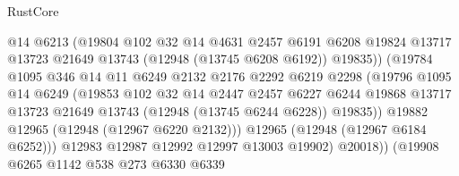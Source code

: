 \begin{lexlean}{RustCore}
\begin{coremodule}
                                @14
                                @6213
                                (@19804
                                  @102
                                  @32
                                  @14
                                  @4631
                                  @2457
                                  @6191
                                  @6208
                                  @19824
                                  @13717
                                  @13723
                                  @21649
                                  @13743
                                  (@12948 (@13745 @6208 @6192))
                                  @19835))
                              (@19784
                                @1095
                                @346
                                @14
                                @11
                                @6249
                                @2132
                                @2176
                                @2292
                                @6219
                                @2298
                                (@19796
                                  @1095
                                  @14
                                  @6249
                                  (@19853
                                    @102
                                    @32
                                    @14
                                    @2447
                                    @2457
                                    @6227
                                    @6244
                                    @19868
                                    @13717
                                    @13723
                                    @21649
                                    @13743
                                    (@12948 (@13745 @6244 @6228))
                                    @19835))
                                @19882
                                @12965
                                (@12948 (@12967 @6220 @2132)))
                              @12965
                              (@12948 (@12967 @6184 @6252)))
                            @12983
                            @12987
                            @12992
                            @12997
                            @13003
                            @19902)
                          @20018))
                      (@19908
                        @6265
                        @1142
                        @538
                        @273
                        @6330
                        @6339

\end{coremodule}
\end{lexlean}
